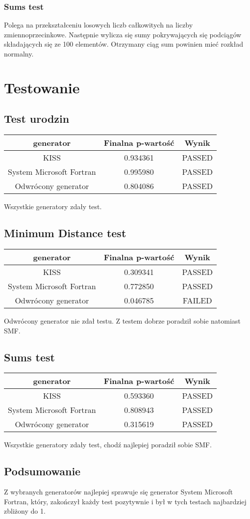 \documentclass[11pt]{aghdpl}
\begin{document}
\subsubsection{Sums test}
Polega na przekształceniu losowych liczb całkowitych na liczby zmiennoprzecinkowe. Następnie wylicza się sumy pokrywających się podciągów składających się ze 100 elementów. Otrzymany ciąg sum powinien mieć rozkład normalny.
\section{Testowanie}
\subsection{Test urodzin}
\begin{center}
\begin{tabular}{ccc}
generator & Finalna p-wartość & Wynik \\ \hline
KISS &  0.934361  & PASSED \\
System Microsoft Fortran & 0.995980 & PASSED \\
Odwrócony generator & 0.804086 & PASSED \\
\end{tabular}
\end{center}
Wszystkie generatory zdały test.
\subsection{Minimum Distance test}
\begin{center}
\begin{tabular}{ccc}
generator & Finalna p-wartość & Wynik \\ \hline
KISS &  0.309341  & PASSED \\
System Microsoft Fortran & 0.772850 & PASSED \\
Odwrócony generator & 0.046785 & FAILED \\
\end{tabular}
\end{center}
Odwrócony generator nie zdał testu. Z testem dobrze poradził sobie natomiast SMF.
\subsection{Sums test}
\begin{center}
\begin{tabular}{ccc}
generator & Finalna p-wartość & Wynik \\ \hline
KISS & 0.593360 & PASSED \\
System Microsoft Fortran & 0.808943 & PASSED \\
Odwrócony generator & 0.315619  & PASSED \\
\end{tabular}
\end{center}
Wszystkie generatory zdały test, chodź najlepiej poradził sobie SMF.
\subsection{Podsumowanie}
Z wybranych generatorów najlepiej sprawuje się generator System Microsoft Fortran, który, zakończył każdy test pozytywnie i był w tych testach najbardziej zbliżony do 1.
\end{document}
